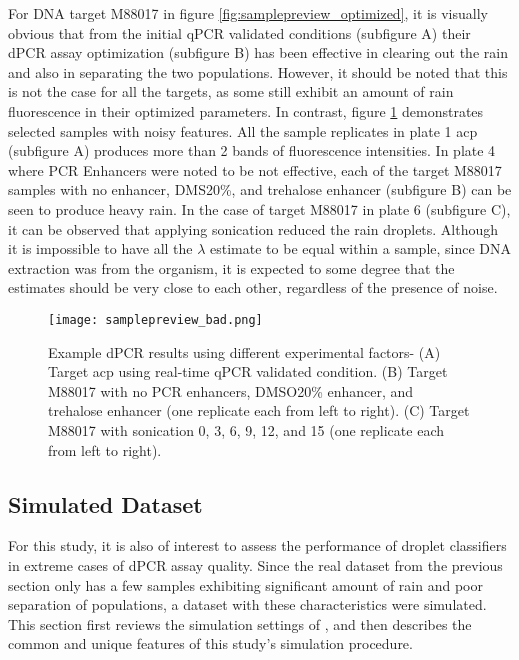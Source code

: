 For DNA target M88017 in figure \ref{fig:samplepreview_optimized}, it is visually obvious that from the initial qPCR validated conditions (subfigure A) their dPCR assay optimization (subfigure B) has been effective in clearing out the rain and also in separating the two populations. However, it should be noted that this is not the case for all the targets, as some still exhibit an amount of rain fluorescence in their optimized parameters. In contrast, figure \ref{fig:samplepreview_bad} demonstrates selected samples with noisy features. All the sample replicates in plate 1 acp (subfigure A) produces more than 2 bands of fluorescence intensities. In plate 4 where PCR Enhancers were noted to be not effective, each of the target M88017 samples with no enhancer, DMS20\%, and trehalose enhancer (subfigure B) can be seen to produce heavy rain. In the case of target M88017 in plate 6 (subfigure C), it can be observed that applying sonication reduced the rain droplets. Although it is impossible to have all the \(\lambda\) estimate to be equal within a sample, since DNA extraction was from the organism, it is expected to some degree that the estimates should be very close to each other, regardless of the presence of noise.

\begin{figure}[h]
    \centering
    \texttt{[image: samplepreview\_bad.png]}
    \caption[Example dPCR results using different experimental factors]%
    { Example dPCR results using different experimental factors- (A) Target acp using real-time qPCR validated condition. (B) Target M88017 with no PCR enhancers, DMSO20\% enhancer, and trehalose enhancer (one replicate each from left to right). (C) Target M88017 with sonication 0, 3, 6, 9, 12, and 15 (one replicate each from left to right).}
     \label{fig:samplepreview_bad}
\end{figure}

\subsection{Simulated Dataset}
\label{sec:simdataset}
For this study, it is also of interest to assess the performance of droplet classifiers in extreme cases of dPCR assay quality. Since the real dataset from the previous section only has a few samples exhibiting significant amount of rain and poor separation of populations, a dataset with these characteristics were simulated. This section first reviews the simulation settings of , and then describes the common and unique features of this study's simulation procedure.

